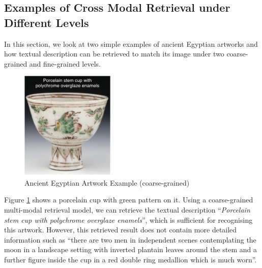 \subsection{Examples of Cross Modal Retrieval under Different Levels}
In this section, we look at two simple examples of ancient Egyptian artworks and how textual description can be retrieved to match its image under two coarse-grained and fine-grained levels.

\begin{figure}[h!]
\centering
\includegraphics[width=0.4\textwidth]{artwork_fine1.pdf}
\caption{Ancient Egyptian Artwork Example (coarse-grained)}
\label{fig:artwork1}
\end{figure}

Figure \ref{fig:artwork1} shows a porcelain cup with green pattern on it. Using a coarse-grained multi-modal retrieval model, we can retrieve the textual description ``\textit{Porcelain stem cup with polychrome overglaze enamels}'', which is sufficient for recognising this artwork. However, this retrieved result does not contain more detailed information such as ``there are two men in independent scenes contemplating the moon in a landscape setting with inverted plantain leaves around the stem and a further figure inside the cup in a red double ring medallion which is much worn''. 

